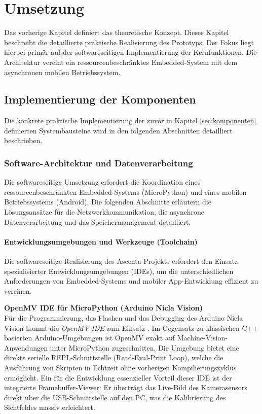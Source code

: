 \chapter{Umsetzung}
Das vorherige Kapitel definiert das theoretische Konzept. Dieses Kapitel beschreibt die detaillierte praktische Realisierung des Prototyps. Der Fokus liegt hierbei primär auf der softwareseitigen Implementierung der Kernfunktionen. Die Architektur vereint ein ressourcenbeschränktes Embedded-System mit dem asynchronen mobilen Betriebssystem.

\section{Implementierung der Komponenten}
Die konkrete praktische Implementierung der zuvor in Kapitel \ref{sec:komponenten} definierten Systembausteine wird in den folgenden Abschnitten detailliert beschrieben.
\subsection{Software-Architektur und Datenverarbeitung}
\label{sec:software_implementierung}
Die softwareseitige Umsetzung erfordert die Koordination eines ressourcen\-beschränkten Embedded-Systems (MicroPython) und eines mobilen Betriebssystems (Android). Die folgenden Abschnitte erläutern die Lösungsansätze für die Netzwerkkommunikation, die asynchrone Datenverarbeitung und das Speichermanagement detailliert.

\subsubsection*{Entwicklungsumgebungen und Werkzeuge (Toolchain)}
Die softwareseitige Realisierung des \glqq Ascenta\grqq-Projekts erfordert den Einsatz spezialisierter Entwicklungsumgebungen (IDEs), um die unterschiedlichen Anforderungen von Embedded-Systems und mobiler App-Entwicklung effizient zu vereinen.

\textbf{OpenMV IDE für MicroPython (Arduino Nicla Vision)} \\
Für die Programmierung, das Flashen und das Debugging des Arduino Nicla Vision kommt die \textit{OpenMV IDE} zum Einsatz \cite{openmv_ide}. Im Gegensatz zu klassischen C++ basierten Arduino-Umgebungen ist OpenMV exakt auf Machine-Vision-Anwendungen unter MicroPython zugeschnitten. Die Umgebung bietet eine direkte serielle REPL-Schnittstelle (Read-Eval-Print Loop), welche die Ausführung von Skripten in Echtzeit ohne vorherigen Kompilierungszyklus ermöglicht. Ein für die Entwicklung essenzieller Vorteil dieser IDE ist der integrierte Framebuffer-Viewer: Er überträgt das Live-Bild des Kamerasensors direkt über die USB-Schnittstelle auf den PC, was die Kalibrierung des Sichtfeldes massiv erleichtert.

